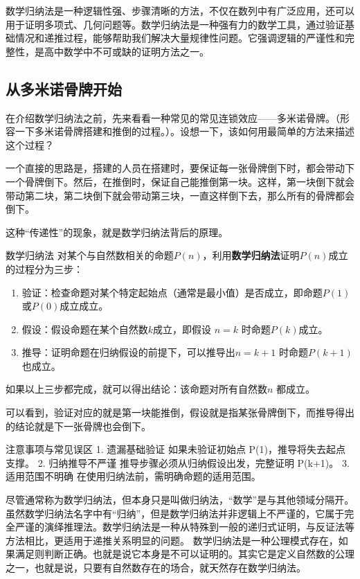 数学归纳法是一种逻辑性强、步骤清晰的方法，不仅在数列中有广泛应用，还可以用于证明多项式、几何问题等。数学归纳法是一种强有力的数学工具，通过验证基础情况和递推过程，能够帮助我们解决大量规律性问题。它强调逻辑的严谨性和完整性，是高中数学中不可或缺的证明方法之一。

\subsection{从多米诺骨牌开始}

在介绍数学归纳法之前，先来看看一种常见的常见连锁效应——多米诺骨牌。（形容一下多米诺骨牌搭建和推倒的过程。）。设想一下，该如何用最简单的方法来描述这个过程？

一个直接的思路是，搭建的人员在搭建时，要保证每一张骨牌倒下时，都会带动下一个骨牌倒下。然后，在推倒时，保证自己能推倒第一块。这样，第一块倒下就会带动第二块，第二块倒下就会带动第三块，一直这样倒下去，那么所有的骨牌都会倒下。

这种“传递性”的现象，就是数学归纳法背后的原理。

\begin{definition}{数学归纳法}
对某个与自然数相关的命题$P(n)$，利用\textbf{数学归纳法}证明$P(n)$成立的过程分为三步：
\begin{enumerate}
\item 验证：检查命题对某个特定起始点（通常是最小值）是否成立，即命题$P(1)$或$P(0)$成立成立。
\item 假设：假设命题在某个自然数$k$成立，即假设 $n = k$ 时命题$P(k)$成立。
\item 推导：证明命题在归纳假设的前提下，可以推导出$n = k+1$ 时命题$P(k+1)$也成立。
\end{enumerate}
如果以上三步都完成，就可以得出结论：该命题对所有自然数$n$ 都成立。
\end{definition}

可以看到，验证对应的就是第一块能推倒，假设就是指某张骨牌倒下，而推导得出的结论就是下一张骨牌也会倒下。

注意事项与常见误区
	1.	遗漏基础验证
如果未验证初始点 P(1)，推导将失去起点支撑。
	2.	归纳推导不严谨
推导步骤必须从归纳假设出发，完整证明 P(k+1)。
	3.	适用范围不明确
在使用归纳法前，需明确命题的适用范围。

尽管通常称为数学归纳法，但本身只是叫做归纳法，“数学”是与其他领域分隔开。虽然数学归纳法名字中有“归纳”，但是数学归纳法并非逻辑上不严谨的，它属于完全严谨的演绎推理法。数学归纳法是一种从特殊到一般的递归式证明，与反证法等方法相比，更适用于递推关系明显的问题。
数学归纳法是一种公理模式存在，如果满足则判断正确。也就是说它本身是不可以证明的。其实它是定义自然数的公理之一，也就是说，只要有自然数存在的场合，就天然存在数学归纳法。

